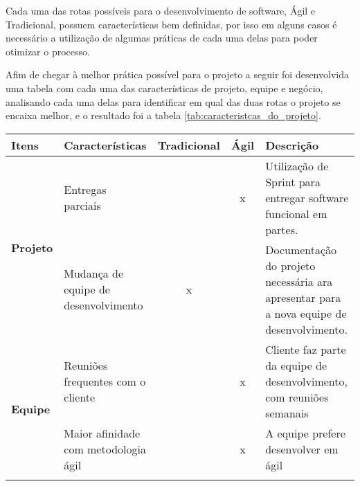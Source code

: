 
Cada uma das rotas possíveis para o desenvolvimento de software, Ágil e Tradicional, possuem características bem definidas, por isso em alguns casos é necessário a utilização de algumas práticas de cada uma delas para poder otimizar o processo.

Afim de chegar à melhor prática possível para o projeto a seguir foi desenvolvida uma tabela com cada uma das características de projeto, equipe e negócio, analisando cada uma delas para identificar em qual das duas rotas o projeto se encaixa melhor, e o resultado foi a tabela \ref{tab:caracteristcas_do_projeto}.

\begin{table}[h]
    \begin{tabular}{|p{2cm}|p{5cm}|c|c|p{4cm}|}
        \hline
        \textbf{Itens} &
        \textbf{Características} &
        \textbf{Tradicional} &
        \textbf{Ágil} &
        \textbf{Descrição}
        \\ 
        \hline
        \multirow{2}{*}{
            \textbf{Projeto}} &
                Entregas parciais &
                 &
                x &
                Utilização de Sprint para entregar software funcional em partes.
                \\
                \cline{2-5} 
                 &
                Mudança de equipe de desenvolvimento &
                x &
                 &
                Documentação do projeto necessária  ara apresentar para a nova equipe de desenvolvimento. 
                \\ 
                \hline
        \multirow{3}{*}{
            \textbf{Equipe}} &
                Reuniões frequentes com o cliente &
                 &
                x &
                Cliente faz parte da equipe de desenvolvimento, com reuniões semanais
                \\
                \cline{2-5}
                 &
                Maior afinidade com metodologia ágil &
                 &
                x &
                A equipe prefere desenvolver em ágil
                \\
                \cline{2-5} 

\end{tabular}
\end{table}
